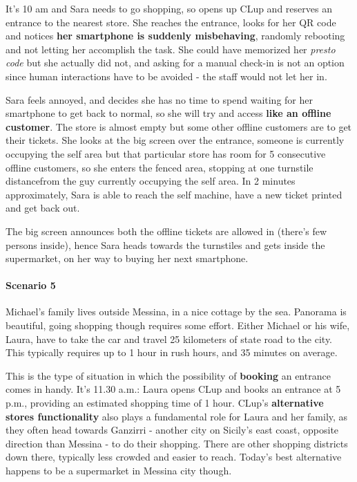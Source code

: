 It's 10 am and Sara needs to go shopping, so opens up CLup and reserves an entrance to the nearest store. She reaches the entrance, looks for her QR code and notices \textbf{her smartphone is suddenly misbehaving}, randomly rebooting and not letting her accomplish the task. \newline
She could have memorized her \textit{presto code} but she actually did not, and asking for a manual check-in is not an option since human interactions have to be avoided - the staff would not let her in.

Sara feels annoyed, and decides she has no time to spend waiting for her smartphone to get back to normal, so she will try and access \textbf{like an offline customer}. The store is almost empty but some other offline customers are to get their tickets. \newline
She looks at the big screen over the entrance, someone is currently occupying the self area but that particular store has room for 5 consecutive offline customers, so she enters the fenced area, stopping at \guillemotleft one turnstile distance\guillemotright \space from the guy currently occupying the self area. In 2 minutes approximately, Sara is able to reach the self machine, have a new ticket printed and get back out.

The big screen announces both the offline tickets are allowed in (there's few persons inside), hence Sara heads towards the turnstiles and gets inside the supermarket, on her way to buying her next smartphone.


\paragraph{Scenario 5}

Michael's family lives outside Messina, in a nice cottage by the sea. Panorama is beautiful, going shopping though requires some effort. \newline
Either Michael or his wife, Laura, have to take the car and travel 25 kilometers of state road to the city. This typically requires up to 1 hour in rush hours, and 35 minutes on average.

This is the type of situation in which the possibility of \textbf{booking} an entrance comes in handy. It's 11.30 a.m.: Laura opens CLup and books an entrance at 5 p.m., providing an estimated shopping time of 1 hour. \newline
CLup's \textbf{alternative stores functionality} also plays a fundamental role for Laura and her family, as they often head towards Ganzirri - another city on Sicily's east coast, opposite direction than Messina - to do their shopping. There are other shopping districts down there, typically less crowded and easier to reach. Today's best alternative happens to be a supermarket in Messina city though.

